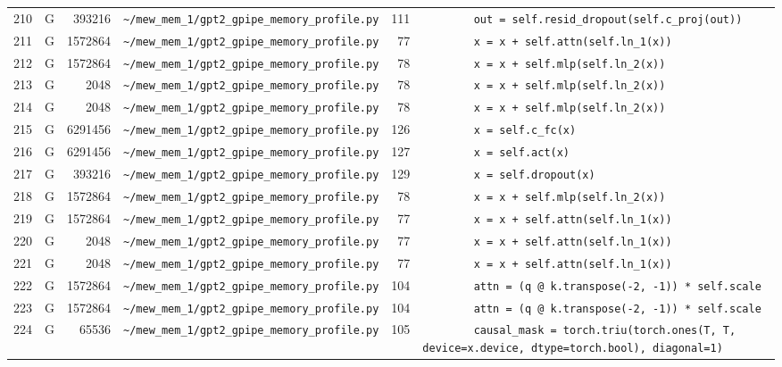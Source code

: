 \documentclass{article}
\begin{document}
\begin{longtable}{r l r p{6.5cm} r p{7.0cm}}
210 & G & 393216 & \lstinline|~/mew_mem_1/gpt2_gpipe_memory_profile.py| & 111 & \lstinline|        out = self.resid_dropout(self.c_proj(out))| \\
211 & G & 1572864 & \lstinline|~/mew_mem_1/gpt2_gpipe_memory_profile.py| & 77 & \lstinline|        x = x + self.attn(self.ln_1(x))| \\
212 & G & 1572864 & \lstinline|~/mew_mem_1/gpt2_gpipe_memory_profile.py| & 78 & \lstinline|        x = x + self.mlp(self.ln_2(x))| \\
213 & G & 2048 & \lstinline|~/mew_mem_1/gpt2_gpipe_memory_profile.py| & 78 & \lstinline|        x = x + self.mlp(self.ln_2(x))| \\
214 & G & 2048 & \lstinline|~/mew_mem_1/gpt2_gpipe_memory_profile.py| & 78 & \lstinline|        x = x + self.mlp(self.ln_2(x))| \\
215 & G & 6291456 & \lstinline|~/mew_mem_1/gpt2_gpipe_memory_profile.py| & 126 & \lstinline|        x = self.c_fc(x)| \\
216 & G & 6291456 & \lstinline|~/mew_mem_1/gpt2_gpipe_memory_profile.py| & 127 & \lstinline|        x = self.act(x)| \\
217 & G & 393216 & \lstinline|~/mew_mem_1/gpt2_gpipe_memory_profile.py| & 129 & \lstinline|        x = self.dropout(x)| \\
218 & G & 1572864 & \lstinline|~/mew_mem_1/gpt2_gpipe_memory_profile.py| & 78 & \lstinline|        x = x + self.mlp(self.ln_2(x))| \\
219 & G & 1572864 & \lstinline|~/mew_mem_1/gpt2_gpipe_memory_profile.py| & 77 & \lstinline|        x = x + self.attn(self.ln_1(x))| \\
220 & G & 2048 & \lstinline|~/mew_mem_1/gpt2_gpipe_memory_profile.py| & 77 & \lstinline|        x = x + self.attn(self.ln_1(x))| \\
221 & G & 2048 & \lstinline|~/mew_mem_1/gpt2_gpipe_memory_profile.py| & 77 & \lstinline|        x = x + self.attn(self.ln_1(x))| \\
222 & G & 1572864 & \lstinline|~/mew_mem_1/gpt2_gpipe_memory_profile.py| & 104 & \lstinline|        attn = (q @ k.transpose(-2, -1)) * self.scale| \\
223 & G & 1572864 & \lstinline|~/mew_mem_1/gpt2_gpipe_memory_profile.py| & 104 & \lstinline|        attn = (q @ k.transpose(-2, -1)) * self.scale| \\
224 & G & 65536 & \lstinline|~/mew_mem_1/gpt2_gpipe_memory_profile.py| & 105 & \lstinline|        causal_mask = torch.triu(torch.ones(T, T, device=x.device, dtype=torch.bool), diagonal=1)| \\

\end{longtable}
\end{document}
